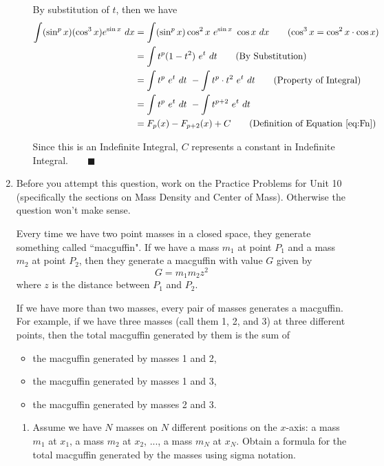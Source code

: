 \documentclass[12pt]{exam}
\begin{document}
\begin{enumerate}
\begin{enumerate}
        By substitution of $t$, then we have
        \begin{align*}
            \int (\sin^p x) ( \cos^3 x)  e^{\sin x}\ dx&=\int (\sin^p x) \cos^2 x\ e^{\sin x}\ \cos x\ dx\qquad(\cos^3 x=\cos^2 x\cdot\cos x)\\
            &=\int t^p (1 - t^2)\ e^t\ dt\qquad(\mbox{By Substitution})\\
            &=\int t^p\ e^t\ dt\ - \int t^p\cdot t^2\ e^t\ dt\qquad(\mbox{Property of Integral})\\
            &=\int t^p\ e^t\ dt\ - \int t^{p+2}\ e^t\ dt\\
            &=F_p(x)-F_{p+2}(x)+C\qquad(\mbox{Definition of Equation \eqref{eq:Fn}})
        \end{align*}
        
        Since this is an Indefinite Integral, $C$ represents a constant in Indefinite Integral.$\qquad\blacksquare$
        
        \newpage
\end{enumerate}

\item Before you attempt this question, work on the Practice Problems for Unit 10 (specifically the sections on Mass Density and Center of Mass).  Otherwise the question won't make sense.

Every time we have two point masses in a closed space, they generate something called ``macguffin".  If we have a mass $m_1$ at point $P_1$ and a mass $m_2$ at point $P_2$, then they generate a macguffin with value $G$ given by
	$$
		G =  m_1 m_2 z^2 
	$$
where $z$ is the distance between $P_1$ and $P_2$.

If we have more than two masses, every pair of masses generates a macguffin.  For example, if we have three masses (call them 1, 2, and 3) at three different points, then the total macguffin generated by them is the sum of 
	\begin{itemize}
		\item the macguffin generated by masses 1 and 2, 
		\item the macguffin generated by masses 1 and 3,
		\item the macguffin generated by masses 2 and 3.
	\end{itemize}
\begin{enumerate}
	\item  Assume we have $N$ masses on $N$ different positions on the $x$-axis: a mass $m_1$ at $x_1$, a mass $m_2$ at $x_2$, ..., a mass $m_N$ at $x_N$.  Obtain a formula for the total macguffin generated by the masses using sigma notation. 
	

\end{enumerate}
\end{enumerate}
\end{document}
